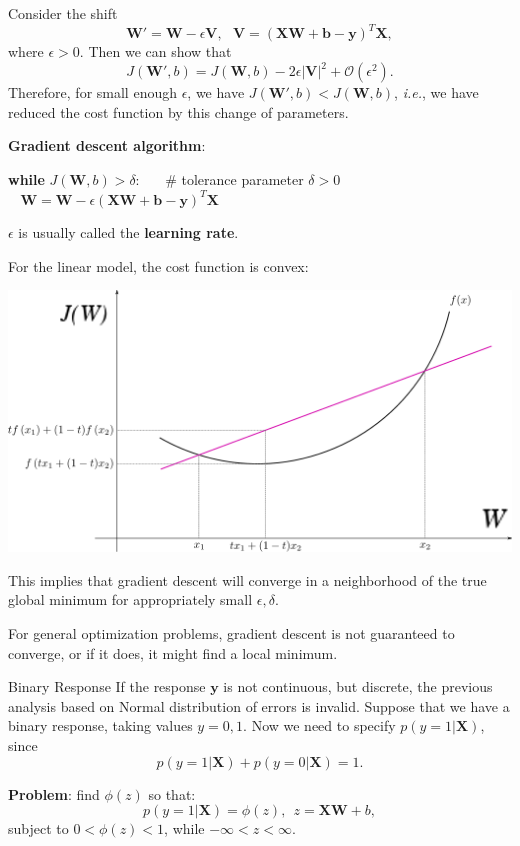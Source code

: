 \documentclass[12pt,t]{beamer}
\begin{document}
\begin{frame}{}
Consider the shift
$$ \mathbf{W}' = \mathbf{W} - \epsilon  \mathbf{V}, ~~~ \mathbf{V} = (\mathbf{X W} + \mathbf{b} -  \mathbf{y})^T \mathbf{X},$$
where $\epsilon > 0$. Then we can show that
$$ J(\mathbf{W}', b) = J(\mathbf{W}, b)  
- 2 \epsilon | \mathbf{V}|^2
+ \mathcal{O}(\epsilon^2).$$
Therefore, for small enough $\epsilon$,  we have $ J(\mathbf{W}', b) < J(\mathbf{W}, b) $, {\it i.e.}, we have reduced the cost function by this change of parameters.

\bigskip
{\bf Gradient descent algorithm}: 

\bigskip
{\bf while} $J(\mathbf{W}, b) > \delta$: ~~~\# tolerance parameter $\delta >0$
 $~~~~ \mathbf{W} = \mathbf{W} - \epsilon (\mathbf{X W} + \mathbf{b} -  \mathbf{y})^T \mathbf{X}$

\bigskip
$\epsilon$ is usually called the {\bf learning rate}.
\end{frame}

\begin{frame}{}
For the linear model, the cost function is convex:

\centerline{
\includegraphics[height=0.5\textheight]{ConvexFunction.png}
}

This implies that gradient descent will converge in a neighborhood of the true global minimum for appropriately small $\epsilon, \delta$.

\bigskip

For general optimization problems, gradient descent is not guaranteed to converge, or if it does, it might find a local minimum.
\end{frame}

\begin{frame}{Binary Response}
If the response  $\mathbf{y}$ is not continuous, but discrete, the previous analysis based on Normal distribution of errors is invalid.  Suppose that we have a binary response, taking values $y  =0,1$.   Now we need to specify $p(y=1|\mathbf{X})$, since
$$ p(y=1|\mathbf{X}) + p(y=0|\mathbf{X}) =1.$$

{\bf Problem}: find $\phi(z)$ so that:
$$ p(y=1|\mathbf{X}) = \phi(z), ~~ z = \mathbf{X W} +b,$$
subject to $ 0 < \phi(z)< 1$, while $-\infty < z < \infty$.


\end{frame}
\end{document}
